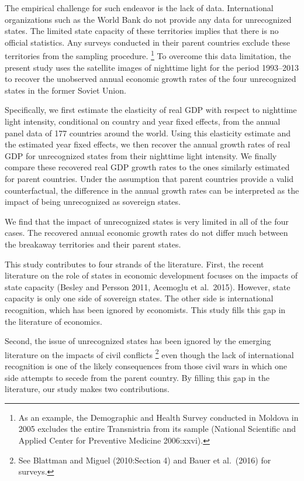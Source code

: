 \documentclass[12pt,a4paper]{article}%
\begin{document}
The empirical challenge for such endeavor is the lack of data. International organizations such as the World Bank do not provide any data for unrecognized states. 
The limited state capacity of these territories implies that there is no official statistics. 
Any surveys conducted in their parent countries exclude these territories from the sampling procedure.%
\footnote{%
	As an example, the Demographic and Health Survey conducted in Moldova in 2005 excludes the entire Transnistria from its sample (National Scientific and Applied Center for Preventive Medicine 2006:xxvi).
} 
To overcome this data limitation, the present study uses the satellite images of nighttime light for the period 1993--2013 to recover the unobserved annual economic growth rates of the four unrecognized states in the former Soviet Union.

Specifically, we first estimate the elasticity of real GDP with respect to nighttime light intensity, conditional on country and year fixed effects, from the annual panel data of 177 countries around the world. 
Using this elasticity estimate and the estimated year fixed effects, we then recover the annual growth rates of real GDP for unrecognized states from their nighttime light intensity. 
We finally compare these recovered real GDP growth rates to the ones similarly estimated for parent countries. 
Under the assumption that parent countries provide a valid counterfactual, the difference in the annual growth rates can be interpreted as the impact of being unrecognized as sovereign states. 

We find that the impact of unrecognized states is very limited in all of the four cases. 
The recovered annual economic growth rates do not differ much between the breakaway territories and their parent states.

This study contributes to four strands of the literature. 
First, the recent literature on the role of states in economic development focuses on the impacts of state capacity (Besley and Persson 2011, Acemoglu et al.\ 2015). 
However, state capacity is only one side of sovereign states. 
The other side is international recognition, which has been ignored by economists. 
This study fills this gap in the literature of economics.

Second, the issue of unrecognized states has been ignored by the emerging literature on the impacts of civil conflicts%
\footnote{
	See Blattman and Miguel (2010:Section 4) and Bauer et al.\ (2016) for surveys.
}  
even though the lack of international recognition is one of the likely consequences from those civil wars in which one side attempts to secede from the parent country. 
By filling this gap in the literature, our study makes two contributions. 
\end{document}
